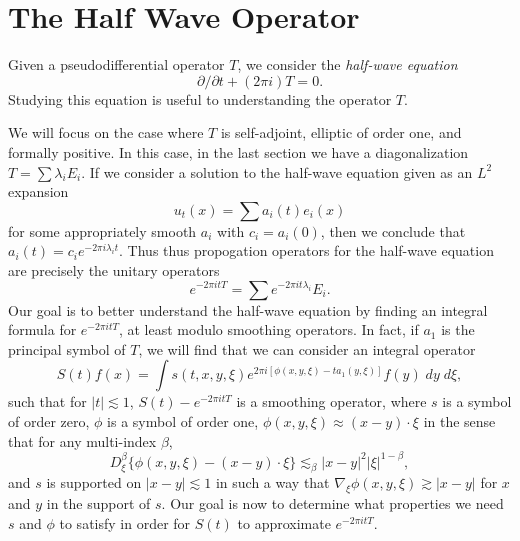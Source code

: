 \section{The Half Wave Operator}

Given a pseudodifferential operator $T$, we consider the \emph{half-wave equation}
%
\[ \partial / \partial t + (2 \pi i) T = 0. \]
%
Studying this equation is useful to understanding the operator $T$.

We will focus on the case where $T$ is self-adjoint, elliptic of order one, and formally positive. In this case, in the last section we have a diagonalization $T = \sum \lambda_i E_i$. If we consider a solution to the half-wave equation given as an $L^2$ expansion
%
\[ u_t(x) = \sum a_i(t) e_i(x) \]
%
for some appropriately smooth $a_i$ with $c_i = a_i(0)$, then we conclude that $a_i(t) = c_i e^{-2 \pi i \lambda_i t}$. Thus thus propogation operators for the half-wave equation are precisely the unitary operators
%
\[ e^{-2 \pi i t T} = \sum e^{-2 \pi i t \lambda_i} E_i. \]
%
Our goal is to better understand the half-wave equation by finding an integral formula for $e^{-2 \pi i t T}$, at least modulo smoothing operators. In fact, if $a_1$ is the principal symbol of $T$, we will find that we can consider an integral operator
%
\[ S(t) f(x) = \int s(t,x,y,\xi) e^{2 \pi i [\phi(x,y,\xi) - t a_1(y,\xi)]} f(y)\; dy\; d\xi, \]
%
such that for $|t| \lesssim 1$, $S(t) - e^{-2 \pi i t T}$ is a smoothing operator, where $s$ is a symbol of order zero, $\phi$ is a symbol of order one, $\phi(x,y,\xi) \approx (x - y) \cdot \xi$ in the sense that for any multi-index $\beta$,
%
\[ D^\beta_\xi \{ \phi(x,y,\xi) - (x - y) \cdot \xi \} \lesssim_\beta |x - y|^2 |\xi|^{1 - \beta}, \]
%
and $s$ is supported on $|x - y| \lesssim 1$ in such a way that $\nabla_\xi \phi(x,y,\xi) \gtrsim |x - y|$ for $x$ and $y$ in the support of $s$. Our goal is now to determine what properties we need $s$ and $\phi$ to satisfy in order for $S(t)$ to approximate $e^{-2 \pi i t T}$.

